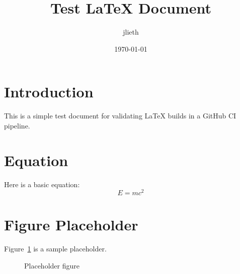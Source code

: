 \documentclass{article}
\title{Test LaTeX Document}
\author{jlieth}
\date{\today}
\begin{document}
\maketitle

\section{Introduction}
This is a simple test document for validating LaTeX builds in a GitHub CI pipeline.

\section{Equation}
Here is a basic equation:
\begin{equation}
    E = mc^2
\end{equation}

\section{Figure Placeholder}
Figure~\ref{fig:placeholder} is a sample placeholder.

\begin{figure}[h]
    \centering
    \fbox{\rule{0pt}{2in} \rule{0.9\linewidth}{0pt}}
    \caption{Placeholder figure}
    \label{fig:placeholder}
\end{figure}
\end{document}
